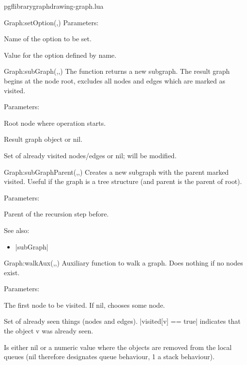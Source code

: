 \begin{filedescription}{pgflibrarygraphdrawing-graph.lua}
\begin{luacommand}{{Graph:setOption}(,)}
Parameters:
\begin{parameterdescription}
	\item[\meta{name}] Name of the option to be set.\item[\meta{value}] Value for the option defined by name.
\end{parameterdescription}



\end{luacommand}\begin{luacommand}{{Graph:subGraph}(,,)}
The function returns a new subgraph. The result graph begins at the node root, excludes all nodes and edges which are marked as visited.

Parameters:
\begin{parameterdescription}
	\item[\meta{root}] Root node where operation starts.\item[\meta{graph}] Result graph object or nil.\item[\meta{visited}] Set of already visited nodes/edges or nil; will be modified.
\end{parameterdescription}



\end{luacommand}\begin{luacommand}{{Graph:subGraphParent}(,,)}
Creates a new subgraph with the parent marked visited. Useful if the graph is a tree structure (and parent is the parent of root).

Parameters:
\begin{parameterdescription}
	\item[\meta{parent}] Parent of the recursion step before.
\end{parameterdescription}



See also:
\begin{itemize}
	\item[] |subGraph|
\end{itemize}

\end{luacommand}\begin{luacommand}{{Graph:walkAux}(,,)}
Auxiliary function to walk a graph. Does nothing if no nodes exist.

Parameters:
\begin{parameterdescription}
	\item[\meta{root}] The first node to be visited.  If nil, chooses some node.\item[\meta{visited}] Set of already seen things (nodes and edges). |visited[v] == true| indicates that the object v was already seen.\item[\meta{removeIndex}] Is either nil or a numeric value where the objects are removed from the local queues (nil therefore designates queue behaviour, 1 a stack behaviour).
\end{parameterdescription}




\end{luacommand}
\end{filedescription}
